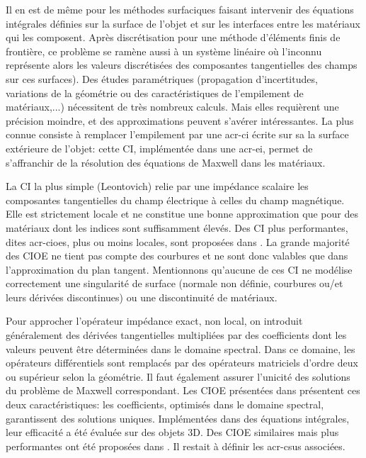 Il en est de même pour les méthodes surfaciques faisant intervenir des équations intégrales définies sur la surface de l'objet et sur les interfaces entre les matériaux qui les composent. Après discrétisation pour une méthode d’éléments finis de frontière, ce problème se ramène aussi à un système linéaire où l'inconnu représente alors les valeurs discrétisées des composantes tangentielles des champs sur ces surfaces).
Des études paramétriques (propagation d’incertitudes, variations de la géométrie ou des caractéristiques de l'empilement de matériaux,...) nécessitent de très nombreux calculs.
Mais elles requièrent une précision moindre, et des approximations peuvent s'avérer intéressantes.
La plus connue consiste à remplacer l'empilement par une \gls{acr-ci} écrite sur sa la surface extérieure de l'objet: cette CI, implémentée dans une \gls{acr-ei}, permet de s’affranchir de la résolution des équations de Maxwell dans les matériaux.

La CI la plus simple (Leontovich) relie par une impédance scalaire les composantes tangentielles du champ électrique à celles du champ magnétique.
Elle est strictement locale et ne constitue une bonne approximation que pour des matériaux dont les indices sont suffisamment élevés.
Des CI plus performantes, dites \glspl{acr-cioe}, plus ou moins locales, sont proposées dans \cite{hoppe_impedance_1995,stupfel_implementation_2015}.
La grande majorité des CIOE ne tient pas compte des courbures et ne sont donc valables que dans l'approximation du plan tangent.
Mentionnons qu'aucune de ces CI ne modélise correctement une singularité de surface (normale non définie, courbures ou/et leurs dérivées discontinues) ou une discontinuité de matériaux.

Pour approcher l’opérateur impédance exact, non local, on introduit généralement des dérivées tangentielles multipliées par des coefficients dont les valeurs peuvent être déterminées dans le domaine spectral. Dans ce domaine, les opérateurs différentiels sont remplacés par des opérateurs matriciels d'ordre deux ou supérieur selon la géométrie.
Il faut également assurer l’unicité des solutions du problème de Maxwell correspondant.
Les CIOE présentées dans \cite{stupfel_sufficient_2011,stupfel_implementation_2015} présentent ces deux caractéristiques: les coefficients, optimisés dans le domaine spectral, garantissent des solutions uniques.
Implémentées dans des équations intégrales, leur efficacité a été évaluée sur des objets 3D.
Des CIOE similaires mais plus performantes ont été proposées dans \cite{marceaux_high-order_2000,aubakirov_electromagnetic_2014,soudais_3d_2017}.
Il restait à définir les \glspl{acr-csu} associées.

